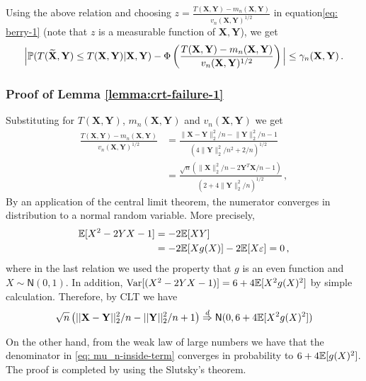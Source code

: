 \documentclass[11pt]{article}
\def\bX{\mathbf{X}}
\def\bY{\mathbf{Y}}
\def\normal{\mathsf{N}}
\def\tbX{\widetilde{\bX}}
\begin{document}
Using the above relation and choosing $z = \tfrac{T(\bX,\bY)-m_n(\bX,\bY)}{v_n(\bX,\bY)^{1/2}}$ in equation\eqref{eq: berry-1} (note that $z$ is a measurable function of $\bX,\bY$), we get
%
\begin{align*}
\Big|\prob({ T(\tbX,\bY) \leq T(\bX,\bY) } | \bX,\bY ) -  \Phi\left(  \frac{T(\bX,\bY)-m_n(\bX,\bY)}{v_n(\bX,\bY)^{1/2}} \right) \Big| \leq   \gamma_n(\bX,\bY)\,.
\end{align*}







\subsubsection{Proof of Lemma \ref{lemma:crt-failure-1} }
Substituting for $T(\bX,\bY)$, $m_n(\bX,\bY)$ and $v_n(\bX,\bY)$ we get
\begin{align}
 \frac{T(\bX,\bY)- m_n(\bX,\bY)}{ v_n(\bX,\bY)^{1/2} }&=  \frac{ \|\bX-\bY\|_2^2/n - {\|\bY\|_2^2}/{n}-1 }{ \left(  {4 \|\bY\|_2^2}/{n^2}+{2}/{n} \right)^{1/2} } \nonumber\\
 &=\frac{\sqrt{n}\left(  \|\bX\|_2^2/n-2\bY^T\bX/n-1  \right)} { \left( 2+4\|\bY\|_2^2/n  \right)^{1/2} }\,, \label{eq: mu_n-inside-term}
\end{align}
By an application of the central limit theorem, the numerator converges in distribution to a normal random variable. More precisely,
 \begin{align*}
 {\mathbb E}[X^2-2YX-1]&=-2{\mathbb E}[XY]\\
 &=-2{\mathbb E}[Xg(X)]-2{\mathbb E}[X{\varepsilon}]=0\,,
 \end{align*}
where in the last relation we used the property that  $g$ is an even function and $X\sim\normal(0,1)$. In addition, ${\rm Var}[(X^2-2YX-1)]=6+4{\mathbb E}[X^2g(X)^2]$ by simple calculation. Therefore, by CLT we have
\begin{equation} \label{eq:numerator-slutsky}
\sqrt{n} \left(||\bX-\bY||_2^2/n - {||\bY||_2^2}/{n}+1\right) \overset{d}{\Rightarrow}\normal(0,6+4\E[X^2g(X)^2])
\end{equation}

On the other hand, from the weak law of large numbers we have that the denominator in \eqref{eq: mu_n-inside-term} converges in probability to $6+4{\mathbb E}[g(X)^2]$. The proof is completed by using the Slutsky's theorem. %
\end{document}
